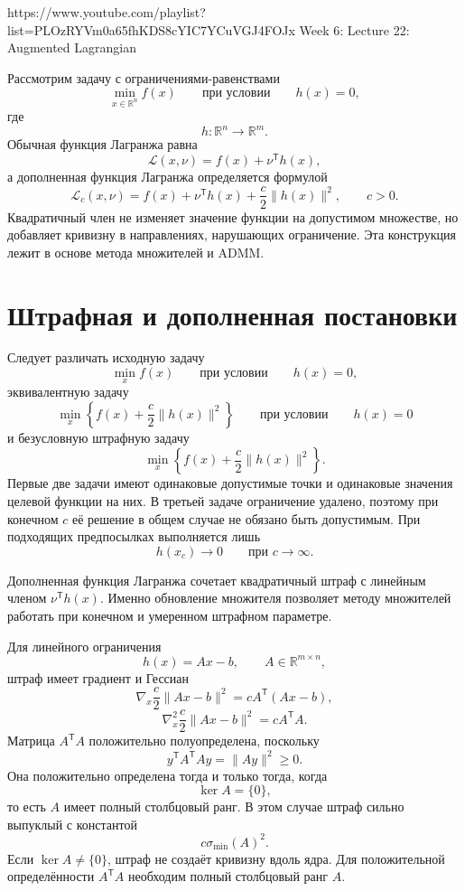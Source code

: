 
\sourcevideo
    {https://www.youtube.com/playlist?list=PLOzRYVm0a65fhKDS8cYIC7YCuVGJ4FOJx}
    {Week 6: Lecture 22: Augmented Lagrangian}

Рассмотрим задачу с ограничениями-равенствами
\[
    \min_{x\in\mathbb R^n} f(x)
    \qquad
    \text{при условии}
    \qquad
    h(x)=0,
\]
где
\[
    h\colon\mathbb R^n\to\mathbb R^m.
\]
Обычная функция Лагранжа равна
\[
    \mathcal L(x,\nu)
    =
    f(x)+\nu^{\mathsf T}h(x),
\]
а дополненная функция Лагранжа определяется формулой
\[
    \mathcal L_c(x,\nu)
    =
    f(x)
    +
    \nu^{\mathsf T}h(x)
    +
    \frac c2\lVert h(x)\rVert^2,
    \qquad
    c>0.
\]
Квадратичный член не изменяет значение функции на допустимом
множестве, но добавляет кривизну в направлениях, нарушающих
ограничение. Эта конструкция лежит в основе метода множителей и ADMM.

\section{Штрафная и дополненная постановки}

Следует различать исходную задачу
\[
    \min_x f(x)
    \qquad
    \text{при условии}
    \qquad
    h(x)=0,
\]
эквивалентную задачу
\[
    \min_x
    \left\{
        f(x)+\frac c2\lVert h(x)\rVert^2
    \right\}
    \qquad
    \text{при условии}
    \qquad
    h(x)=0
\]
и безусловную штрафную задачу
\[
    \min_x
    \left\{
        f(x)+\frac c2\lVert h(x)\rVert^2
    \right\}.
\]
Первые две задачи имеют одинаковые допустимые точки и одинаковые
значения целевой функции на них. В третьей задаче ограничение удалено,
поэтому при конечном \(c\) её решение в общем случае не обязано быть
допустимым. При подходящих предпосылках выполняется лишь
\[
    h(x_c)\to0
    \qquad
    \text{при }c\to\infty.
\]

Дополненная функция Лагранжа сочетает квадратичный штраф с линейным
членом \(\nu^{\mathsf T}h(x)\). Именно обновление множителя позволяет
методу множителей работать при конечном и умеренном штрафном
параметре.

Для линейного ограничения
\[
    h(x)=Ax-b,
    \qquad
    A\in\mathbb R^{m\times n},
\]
штраф имеет градиент и Гессиан
\[
    \nabla_x\frac c2\lVert Ax-b\rVert^2
    =
    cA^{\mathsf T}(Ax-b),
\]
\[
    \nabla_x^2\frac c2\lVert Ax-b\rVert^2
    =
    cA^{\mathsf T}A.
\]
Матрица \(A^{\mathsf T}A\) положительно полуопределена, поскольку
\[
    y^{\mathsf T}A^{\mathsf T}Ay
    =
    \lVert Ay\rVert^2
    \ge0.
\]
Она положительно определена тогда и только тогда, когда
\[
    \ker A=\{0\},
\]
то есть \(A\) имеет полный столбцовый ранг. В этом случае штраф
сильно выпуклый с константой
\[
    c\sigma_{\min}(A)^2.
\]
Если \(\ker A\ne\{0\}\), штраф не создаёт кривизну вдоль ядра.
Для положительной определённости \(A^{\mathsf T}A\) необходим полный столбцовый ранг \(A\).

